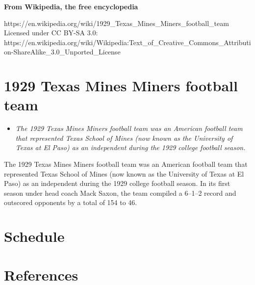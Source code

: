\textbf{From Wikipedia, the free encyclopedia}

https://en.wikipedia.org/wiki/1929\_Texas\_Mines\_Miners\_football\_team\\
Licensed under CC BY-SA 3.0:\\
https://en.wikipedia.org/wiki/Wikipedia:Text\_of\_Creative\_Commons\_Attribution-ShareAlike\_3.0\_Unported\_License

\section{1929 Texas Mines Miners football
team}\label{texas-mines-miners-football-team}

\begin{itemize}
\item
  \emph{The 1929 Texas Mines Miners football team was an American
  football team that represented Texas School of Mines (now known as the
  University of Texas at El Paso) as an independent during the 1929
  college football season.}
\end{itemize}

The 1929 Texas Mines Miners football team was an American football team
that represented Texas School of Mines (now known as the University of
Texas at El Paso) as an independent during the 1929 college football
season. In its first season under head coach Mack Saxon, the team
compiled a 6--1--2 record and outscored opponents by a total of 154 to
46.

\section{Schedule}\label{schedule}

\section{References}\label{references}
